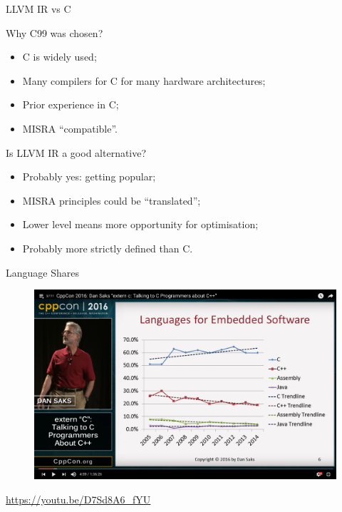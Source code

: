 \documentclass[xcolor={usenames,dvipsnames}]{beamer}
\begin{document}
\begin{frame}{LLVM IR vs C}

  Why C99 was chosen? \vspace{-1ex}
  \begin{itemize}
    \item C is widely used;
    \item Many compilers for C for many hardware architectures;
    \item Prior experience in C;
    \item MISRA ``compatible''.
  \end{itemize}

  \vfill

  Is LLVM IR a good alternative? \vspace{-1ex}
  \begin{itemize}
    \item Probably yes: getting popular;
    \item MISRA principles could be ``translated'';
    \item Lower level means more opportunity for optimisation;
    \item Probably more strictly defined than C.
  \end{itemize}

\end{frame}


\begin{frame}{Language Shares}
  \begin{figure}
    \includegraphics[width=\textwidth]{res/saks.embedded.languages.shares.png}
  \end{figure}
  \hfill \tiny \url{https://youtu.be/D7Sd8A6_fYU}
\end{frame}
\end{document}
